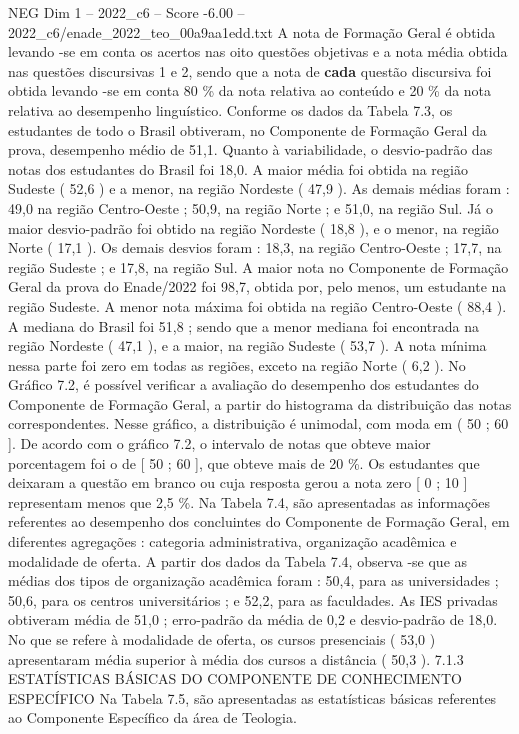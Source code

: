 \begin{textsample}{NEG Dim 1 – 2022\_c6 – Score -6.00 – 2022\_c6/enade\_2022\_teo\_00a9aa1edd.txt}
A nota de Formação Geral é obtida levando -se em conta os acertos nas oito questões objetivas e a nota média obtida nas questões discursivas 1 e 2, sendo que a nota de \textbf{cada} questão discursiva foi obtida levando -se em conta 80 \% da nota relativa ao conteúdo e 20 \% da nota relativa ao desempenho linguístico.
Conforme os dados da Tabela 7.3, os estudantes de todo o Brasil obtiveram, no Componente de Formação Geral da prova, desempenho médio de 51,1.
Quanto à variabilidade, o desvio-padrão das notas dos estudantes do Brasil foi 18,0.
A maior média foi obtida na região Sudeste ( 52,6 ) e a menor, na região Nordeste ( 47,9 ).
As demais médias foram : 49,0 na região Centro-Oeste ; 50,9, na região Norte ; e 51,0, na região Sul.
Já o maior desvio-padrão foi obtido na região Nordeste ( 18,8 ), e o menor, na região Norte ( 17,1 ).
Os demais desvios foram : 18,3, na região Centro-Oeste ; 17,7, na região Sudeste ; e 17,8, na região Sul.
A maior nota no Componente de Formação Geral da prova do Enade/2022 foi 98,7, obtida por, pelo menos, um estudante na região Sudeste.
A menor nota máxima foi obtida na região Centro-Oeste ( 88,4 ).
A mediana do Brasil foi 51,8 ; sendo que a menor mediana foi encontrada na região Nordeste ( 47,1 ), e a maior, na região Sudeste ( 53,7 ).
A nota mínima nessa parte foi zero em todas as regiões, exceto na região Norte ( 6,2 ).
No Gráfico 7.2, é possível verificar a avaliação do desempenho dos estudantes do Componente de Formação Geral, a partir do histograma da distribuição das notas correspondentes.
Nesse gráfico, a distribuição é unimodal, com moda em ( 50 ; 60 ].
De acordo com o gráfico 7.2, o intervalo de notas que obteve maior porcentagem foi o de [ 50 ; 60 ], que obteve mais de 20 \%.
Os estudantes que deixaram a questão em branco ou cuja resposta gerou a nota zero [ 0 ; 10 ] representam menos que 2,5 \%.
Na Tabela 7.4, são apresentadas as informações referentes ao desempenho dos concluintes do Componente de Formação Geral, em diferentes agregações : categoria administrativa, organização acadêmica e modalidade de oferta.
A partir dos dados da Tabela 7.4, observa -se que as médias dos tipos de organização acadêmica foram : 50,4, para as universidades ; 50,6, para os centros universitários ; e 52,2, para as faculdades.
As IES privadas obtiveram média de 51,0 ; erro-padrão da média de 0,2 e desvio-padrão de 18,0.
No que se refere à modalidade de oferta, os cursos presenciais ( 53,0 ) apresentaram média superior à média dos cursos a distância ( 50,3 ). 7.1.3 ESTATÍSTICAS BÁSICAS DO COMPONENTE DE CONHECIMENTO ESPECÍFICO Na Tabela 7.5, são apresentadas as estatísticas básicas referentes ao Componente Específico da área de Teologia.

\end{textsample}

